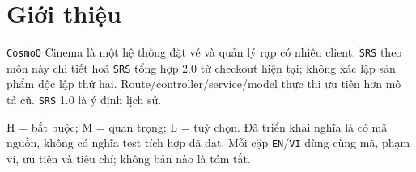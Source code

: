 \clearpage
\section{Giới thiệu}\label{sec:srs-1}
\texttt{Cosmo\allowbreak{}Q} Cinema là một hệ thống đặt vé và quản lý rạp có nhiều client. \texttt{SRS} theo môn này chi tiết hoá \texttt{SRS} tổng hợp 2.0 từ checkout hiện tại; không xác lập sản phẩm độc lập thứ hai. Route/\allowbreak{}controller/\allowbreak{}service/\allowbreak{}model thực thi ưu tiên hơn mô tả cũ. \texttt{SRS} 1.0 là ý định lịch sử.

H = bắt buộc; M = quan trọng; L = tuỳ chọn. Đã triển khai nghĩa là có mã nguồn, không có nghĩa test tích hợp đã đạt. Mỗi cặp \texttt{EN}/\allowbreak{}\texttt{VI} dùng cùng mã, phạm vi, ưu tiên và tiêu chí; không bản nào là tóm tắt.
